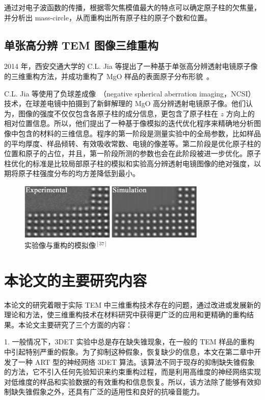 通过对电子波函数的传播，根据零欠焦模值最大的特点可以确定原子柱的欠焦量，并分析出 mass-circle，从而重构出所有原子柱的原子个数和位置。



\subsection{单张高分辨 TEM 图像三维重构}
2014 年，西安交通大学的 C.L. Jia 等提出了一种基于单张高分辨透射电镜原子像的三维重构方法，并成功重构了 MgO 样品的表面原子分布形貌~\cite{Jia2014}。

C.L. Jia 等使用了负球差成像~\cite{Jia2006,Jia2004,Urban2009,Jia2003,Jia1999}（negative spherical aberration imaging，NCSI）技术，在球差电镜中拍摄到了新鲜解理的 MgO 高分辨透射电镜原子像。他们认为，图像的强度不仅仅包含各原子柱的成分信息，更包含了原子柱在 $z$ 方向上的相对位置信息。所以，他们提出了一种基于像模拟的迭代优化程序来精确地分析图像中包含的材料的三维信息。程序的第一阶段是测量实验中的全局参数，比如样品的平均厚度、样品倾转、有效吸收常数、电镜的像差等。第二阶段是优化原子柱的位置和原子的占位，并且，第一阶段所测的参数也会在此阶段被进一步优化。原子柱优化的标准是比较局部原子柱的模拟和实验高分辨透射电镜图像的绝对强度，以期将原子柱强度分布的均方差降低到最小。

\begin{figure}[htbp]
	\vspace{\baselineskip}
	\centering
	\includegraphics[width=0.8\textwidth]{../1.16/1_16}
	\caption{实验像与重构的模拟像$^{[37]}$}\label{fig:116}
\end{figure}

\section{本论文的主要研究内容}
本论文的研究着眼于实际 TEM 中三维重构技术存在的问题，通过改进或发展新的理论和方法，使三维重构技术在材料研究中获得更广泛的应用和更精确的重构结果。本论文主要研究了三个方面的内容：



1. 一般情况下，3DET 实验中总是存在缺失锥现象，在一般的 TEM 样品的重构中引起特别严重的假象。为了抑制这种假象，恢复缺少的信息，本文在第二章中开发了一种 ART 型的神经网络 3DET 算法。该算法不同于现存的抑制缺失锥假象的方法，它不引入任何先验知识来约束重构过程，而是利用高维度的神经网络实现对低维度的样品和实验数据的有效重构和信息恢复。所以，该方法除了能够有效抑制缺失锥假象之外，还具有广泛的适用性和良好的抗噪音能力。

